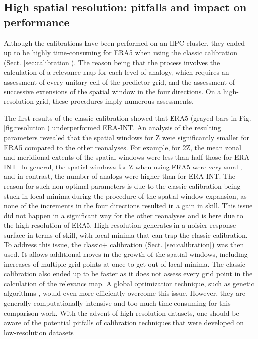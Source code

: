 \documentclass[alpha-refs]{wiley-article}
\begin{document}
\subsection{High spatial resolution: pitfalls and impact on performance}
\label{sec:results_hires}

Although the calibrations have been performed on an HPC cluster, they ended up to be highly time-consuming for ERA5 when using the classic calibration (Sect. \ref{sec:calibration}). The reason being that the process involves the calculation of a relevance map for each level of analogy, which requires an assessment of every unitary cell of the predictor grid, and the assessment of successive extensions of the spatial window in the four directions. On a high-resolution grid, these procedures imply numerous assessments.

The first results of the classic calibration showed that ERA5 (grayed bars in Fig. \ref{fig:resolution}) underperformed ERA-INT. An analysis of the resulting parameters revealed that the spatial windows for Z were significantly smaller for ERA5 compared to the other reanalyses. For example, for 2Z, the mean zonal and meridional extents of the spatial windows were less than half those for ERA-INT. In general, the spatial windows for Z when using ERA5 were very small, and in contrast, the number of analogs were higher than for ERA-INT. The reason for such non-optimal parameters is due to the classic calibration being stuck in local minima during the procedure of the spatial window expansion, as none of the increments in the four directions resulted in a gain in skill. This issue did not happen in a significant way for the other reanalyses and is here due to the high resolution of ERA5. High resolution generates in a noisier response surface in terms of skill, with local minima that can trap the classic calibration. To address this issue, the classic+ calibration (Sect. \ref{sec:calibration}) was then used. It allows additional moves in the growth of the spatial windows, including increases of multiple grid points at once to get out of local minima. The classic+ calibration also ended up to be faster as it does not assess every grid point in the calculation of the relevance map. A global optimization technique, such as genetic algorithms \citep{Horton2017a}, would even more efficiently overcome this issue. However, they are generally computationally intensive and too much time consuming for this comparison work. With the advent of high-resolution datasets, one should be aware of the potential pitfalls of calibration techniques that were developed on low-resolution datasets
\end{document}
